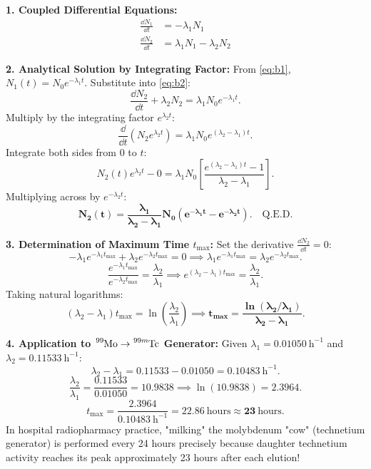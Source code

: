 \begin{solution}
\textbf{1. Coupled Differential Equations:}
\begin{align}
\frac{\dd N_1}{\dd t} &= -\lambda_1 N_1 \label{eq:b1} \\
\frac{\dd N_2}{\dd t} &= \lambda_1 N_1 - \lambda_2 N_2 \label{eq:b2}
\end{align}

\textbf{2. Analytical Solution by Integrating Factor:}
From \eqref{eq:b1}, $N_1(t) = N_0 e^{-\lambda_1 t}$. Substitute into \eqref{eq:b2}:
\[
\frac{\dd N_2}{\dd t} + \lambda_2 N_2 = \lambda_1 N_0 e^{-\lambda_1 t}.
\]
Multiply by the integrating factor $e^{\lambda_2 t}$:
\[
\frac{\dd}{\dd t} \left( N_2 e^{\lambda_2 t} \right) = \lambda_1 N_0 e^{(\lambda_2 - \lambda_1) t}.
\]
Integrate both sides from $0$ to $t$:
\[
N_2(t) e^{\lambda_2 t} - 0 = \lambda_1 N_0 \left[ \frac{e^{(\lambda_2 - \lambda_1) t} - 1}{\lambda_2 - \lambda_1} \right].
\]
Multiplying across by $e^{-\lambda_2 t}$:
\[
\mathbf{N_2(t) = \frac{\lambda_1}{\lambda_2 - \lambda_1} N_0 \left( e^{-\lambda_1 t} - e^{-\lambda_2 t} \right)}. \quad \text{Q.E.D.}
\]

\textbf{3. Determination of Maximum Time $t_{\max}$:}
Set the derivative $\frac{\dd N_2}{\dd t} = 0$:
\[
-\lambda_1 e^{-\lambda_1 t_{\max}} + \lambda_2 e^{-\lambda_2 t_{\max}} = 0 \implies \lambda_1 e^{-\lambda_1 t_{\max}} = \lambda_2 e^{-\lambda_2 t_{\max}}.
\]
\[
\frac{e^{-\lambda_1 t_{\max}}}{e^{-\lambda_2 t_{\max}}} = \frac{\lambda_2}{\lambda_1} \implies e^{(\lambda_2 - \lambda_1) t_{\max}} = \frac{\lambda_2}{\lambda_1}.
\]
Taking natural logarithms:
\[
(\lambda_2 - \lambda_1) t_{\max} = \ln \left( \frac{\lambda_2}{\lambda_1} \right) \implies \mathbf{t_{\max} = \frac{\ln(\lambda_2 / \lambda_1)}{\lambda_2 - \lambda_1}}.
\]

\textbf{4. Application to $\ce{^{99}Mo} \to \ce{^{99m}Tc}$ Generator:}
Given $\lambda_1 = 0.01050\ \mathrm{h^{-1}}$ and $\lambda_2 = 0.11533\ \mathrm{h^{-1}}$:
\[
\lambda_2 - \lambda_1 = 0.11533 - 0.01050 = 0.10483\ \mathrm{h^{-1}}.
\]
\[
\frac{\lambda_2}{\lambda_1} = \frac{0.11533}{0.01050} = 10.9838 \implies \ln(10.9838) = 2.3964.
\]
\[
t_{\max} = \frac{2.3964}{0.10483\ \mathrm{h^{-1}}} = \mathbf{22.86\ \mathrm{hours}} \approx \mathbf{23\ \mathrm{hours}}.
\]
In hospital radiopharmacy practice, "milking" the molybdenum "cow" (technetium generator) is performed every 24 hours precisely because daughter technetium activity reaches its peak approximately 23 hours after each elution!
\end{solution}
